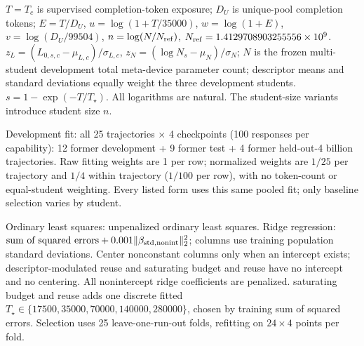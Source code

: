 \begin{minipage}{\textwidth}\scriptsize
$T=T_c$ is supervised completion-token exposure; $D_U$ is unique-pool completion tokens; $E=T/D_U$, $u=\log(1+T/35000)$, $w=\log(1+E)$, $v=\log(D_U/99504)$, $n=\log(N/N_{\rm ref})$, $N_{\rm ref}=1.4129708903255556\times10^9$. $z_L=(L_{0,s,c}-\mu_{L,c})/\sigma_{L,c}$, $z_N=(\log N_s-\mu_N)/\sigma_N$; $N$ is the frozen multi-student development total meta-device parameter count; descriptor means and standard deviations equally weight the three development students. $s=1-\exp(-T/T_\star)$. All logarithms are natural. The student-size variants introduce student size $n$.
\par Development fit: all 25 trajectories $\times$ 4 checkpoints (100 responses per capability): 12 former development + 9 former test + 4 former \mbox{held-out}-4 billion trajectories. Raw fitting weights are 1 per row; normalized weights are $1/25$ per trajectory and $1/4$ within trajectory ($1/100$ per row), with no token-count or equal-student weighting. Every listed form uses this same pooled fit; only baseline selection varies by student.
\par Ordinary least squares: unpenalized ordinary least squares. Ridge regression: $\text{sum of squared errors}+0.001\|\beta_{\rm std,nonint}\|_2^2$; columns use training population standard deviations. Center nonconstant columns only when an intercept exists; descriptor-modulated reuse and saturating budget and reuse have no intercept and no centering. All nonintercept ridge coefficients are penalized. saturating budget and reuse adds one discrete fitted $T_\star\in\{17500,35000,70000,140000,280000\}$, chosen by training sum of squared errors. Selection uses 25 leave-one-run-out folds, refitting on $24\times4$ points per fold.
\end{minipage}
\par\smallskip
\endgroup
